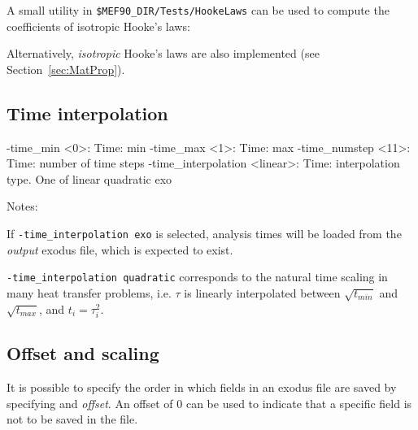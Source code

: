 \documentclass[10pt,oneside]{memoir}
\begin{document}
A small utility in \verb+$MEF90_DIR/Tests/HookeLaws+ can be used to compute the coefficients of isotropic Hooke's laws:

Alternatively, \emph{isotropic} Hooke's laws are also implemented (see Section~\ref{sec:MatProp}).


\subsection{Time interpolation}
\small{
\begin{boxedverbatim}
-time_min <0>: Time: min 
-time_max <1>: Time: max 
-time_numstep <11>: Time: number of time steps 
-time_interpolation <linear>: Time: interpolation type. One of linear quadratic exo
\end{boxedverbatim}
}
Notes: 
\begin{compactenum}
	\item If \verb+-time_interpolation exo+ is selected, analysis times will be loaded from the \emph{output} exodus file, which is expected to exist.
	\item \verb+-time_interpolation quadratic+ corresponds to the natural time scaling in many heat transfer problems, i.e. $\tau$ is linearly interpolated between $$ and $$, and $t_i = \tau_i^2$.
\end{compactenum}

\subsection{Offset and scaling}
It is possible to specify the order in which fields in an exodus file are saved by specifying and \emph{offset}. An offset of 0 can be used to indicate that a specific field is not to be saved in the file.
\end{document}
